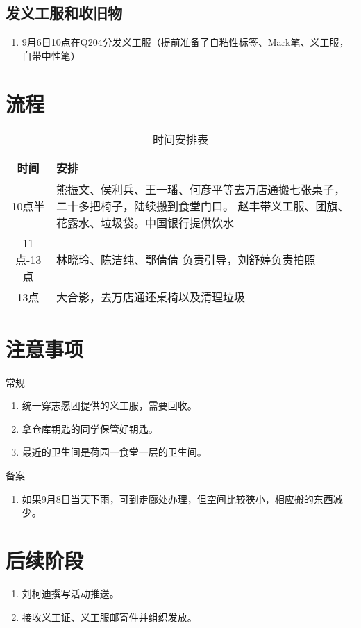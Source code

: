 \documentclass[12pt]{ctexart}
\begin{document}
\subsection{发义工服和收旧物}
\begin{enumerate}
\item 9月6日10点在Q204分发义工服（提前准备了自粘性标签、Mark笔、义工服，自带中性笔）
\end{enumerate}

\section{流程}
\begin{table}[!ht]
\centering
\begin{tabular}{|c|p{6cm}|}
\hline
时间 & 安排 \\
\hline
10点半 & 熊振文、侯利兵、王一璠、何彦平等去万店通搬七张桌子，二十多把椅子，陆续搬到食堂门口。 赵丰带义工服、团旗、花露水、垃圾袋。中国银行提供饮水\\
\hline
11点-13点 & 林晓玲、陈洁纯、鄂倩倩 负责引导，刘舒婷负责拍照\\
\hline
13点 & 大合影，去万店通还桌椅以及清理垃圾\\
\hline
\end{tabular}
\caption{时间安排表}\label{route}
\end{table}

\section{注意事项}

常规
\begin{enumerate}
\item 统一穿志愿团提供的义工服，需要回收。
\item 拿仓库钥匙的同学保管好钥匙。
\item 最近的卫生间是荷园一食堂一层的卫生间。
\end{enumerate}

备案
\begin{enumerate}
\item 如果9月8日当天下雨，可到走廊处办理，但空间比较狭小，相应搬的东西减少。
\end{enumerate}
\section{后续阶段}
\begin{enumerate}
\item 刘柯迪撰写活动推送。
\item 接收义工证、义工服邮寄件并组织发放。
\end{enumerate}
\end{document}
